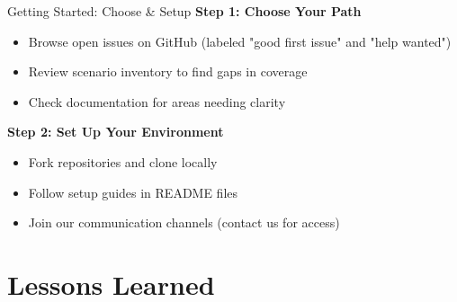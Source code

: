 \documentclass[aspectratio=169]{beamer}
\begin{document}
\begin{frame}{Getting Started: Choose \& Setup}
  \textbf{Step 1: Choose Your Path}
  \begin{itemize}
    \item Browse open issues on GitHub (labeled "good first issue" and "help wanted")
    \item Review scenario inventory to find gaps in coverage
    \item Check documentation for areas needing clarity
  \end{itemize}
  
  \textbf{Step 2: Set Up Your Environment}
  \begin{itemize}
    \item Fork repositories and clone locally
    \item Follow setup guides in README files
    \item Join our communication channels (contact us for access)
  \end{itemize}
\end{frame}

\begin {comment}
\begin{frame}{Getting Started: Contribute \& Engage}
  \textbf{Step 3: Submit Your Contribution}
  \begin{itemize}
    \item Create pull request with clear description
    \item Ensure tests pass (where CI exists)
    \item Engage with code review feedback
  \end{itemize}
  
  \textbf{What to Expect}
  \begin{itemize}
    \item Friendly, constructive code reviews
    \item Response within 3-5 business days
    \item Recognition in contributors list and release notes
  \end{itemize}
  \note[item]{Final step plus expectations to encourage new contributors.}
\end{frame}
\end{comment}

\section{Lessons Learned}
\end{document}
